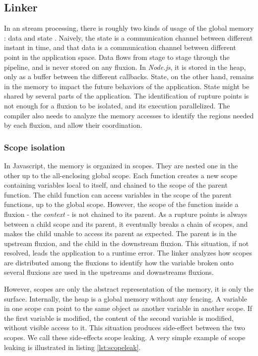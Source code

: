 \subsection{Linker} \label{section:linker}

In an stream processing, there is roughly two kinds of usage of the global memory : data and state \cite{Fernandez2014a}.
Naively, the state is a communication channel between different instant in time, and that data is a communication channel between different point in the application space.
Data flows from stage to stage through the pipeline, and is never stored on any fluxion. In \textit{Node.js}, it is stored in the heap, only as a buffer between the different callbacks.
State, on the other hand, remains in the memory to impact the future behaviors of the application.
State might be shared by several parts of the application.
The identification of rupture points is not enough for a fluxion to be isolated, and its execution parallelized.
The compiler also needs to analyze the memory accesses to identify the regions needed by each fluxion, and allow their coordination.

\subsubsection{Scope isolation}

In Javascript, the memory is organized in scopes.
They are nested one in the other up to the all-enclosing global scope.
Each function creates a new scope containing variables local to itself, and chained to the scope of the parent function.
The child function can access variables in the scope of the parent functions, up to the global scope.
However, the scope of the function inside a fluxion - the \textit{context} - is not chained to its parent.
As a rupture points is always between a child scope and its parent, it eventually breaks a chain of scopes, and makes the child unable to access its parent as expected.
The parent is in the upstream fluxion, and the child in the downstream fluxion.
This situation, if not resolved, leads the application to a runtime error.
The linker analyzes how scopes are distributed among the fluxions to identify how the variable broken onto several fluxions are used in the upstreams and downstreams fluxions.

However, scopes are only the abstract representation of the memory, it is only the surface.
Internally, the heap is a global memory without any fencing.
A variable in one scope can point to the same object as another variable in another scope.
If the first variable is modified, the content of the second variable is modified, without visible access to it.
This situation produces side-effect between the two scopes.
We call these side-effects scope leaking.
A very simple example of scope leaking is illustrated in listing \ref{lst:scopeleak}.

